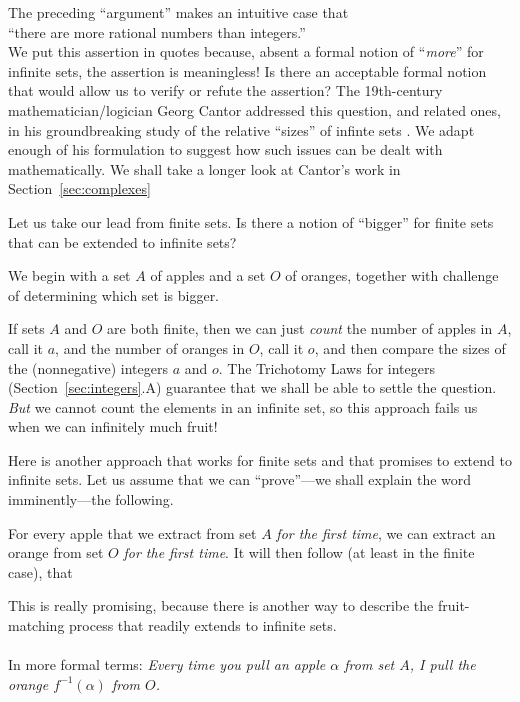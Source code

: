 \medskip

\noindent
The preceding ``argument'' makes an intuitive case that \\
\hspace*{.35in}``there are more rational numbers than integers.'' \\ 
We put this assertion in quotes because, absent a formal notion of
``{\em more}'' for infinite sets, the assertion is meaningless!  Is
there an acceptable formal notion that would allow us to verify or
refute the assertion?  The 19th-century mathematician/logician Georg
Cantor addressed this question, and related ones, in his
groundbreaking study of the relative ``sizes'' of infinte sets
\cite{Cantor74,Cantor78}.  We adapt enough of his formulation to
suggest how such issues can be dealt with mathematically.  We shall
take a longer look at Cantor's work in Section~\ref{sec:complexes}

Let us take our lead from finite sets.  Is there a notion of
``bigger'' for finite sets that can be extended to infinite sets?

We begin with a set $A$ of apples and a set $O$ of oranges, together
with challenge of determining which set is bigger.

\medskip

If sets $A$ and $O$ are both finite, then we can just {\em count} the
number of apples in $A$, call it $a$, and the number of oranges in
$O$, call it $o$, and then compare the sizes of the (nonnegative)
integers $a$ and $o$.  The Trichotomy Laws for integers
(Section~\ref{sec:integers}.A) guarantee that we shall be able to
settle the question.  {\em But} we cannot count the elements in an
infinite set, so this approach fails us when we can infinitely much
fruit!

\medskip

Here is another approach that works for finite sets and that promises
to extend to infinite sets.  Let us assume that we can ``prove''---we
shall explain the word imminently---the following.

For every apple that we extract from set $A$ {\em for the first time},
we can extract an orange from set $O$ {\em for the first time}.  It
will then follow (at least in the finite case), that \\
\hspace*{.35in}{\em There are at least as many oranges as apples!}

\noindent
This is really promising, because there is another way to describe the
fruit-matching process that readily extends to infinite sets.  \\
 \\
In more formal terms: {\em Every time you pull an apple $\alpha$ from set
  $A$, I pull the orange $f^{-1}(\alpha)$ from $O$.}


